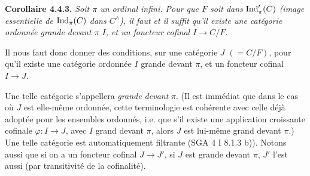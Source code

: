\textbf{Corollaire 4.4.3.} \textit{Soit $\pi$ un ordinal infini. Pour que $F$ soit dans} $\operatorname{Ind}'_\pi(C)$ \textit{(image essentielle de} $\operatorname{Ind}_\pi(C)$ \textit{dans $C^{\wedge}$), il faut et il suffit qu'il existe une catégorie ordonnée grande devant $\pi$ $I$, et un foncteur cofinal $I \longrightarrow C/F$.}

Il nous faut donc donner des conditions, sur une catégorie $J$ $(= C/F)$, pour qu'il existe une catégorie ordonnée $I$ grande devant $\pi$, et un foncteur cofinal $I \longrightarrow J$.

Une telle catégorie s'appellera \textit{grande devant} $\pi$. (Il est immédiat que dans le cas où $J$ est elle-même ordonnée, cette terminologie est cohérente avec celle déjà adoptée pour les ensembles ordonnés, i.e. que s'il existe une application croissante cofinale $\varphi : I \longrightarrow J$, avec $I$ grand devant $\pi$, alors $J$ est lui-même grand devant $\pi$.) Une telle catégorie est
automatiquement filtrante (SGA 4 I 8.1.3 b)). Notons aussi que si on a un foncteur cofinal $J \longrightarrow J'$, si $J$ est grande devant $\pi$, $J'$ l'est aussi (par transitivité de la cofinalité).

